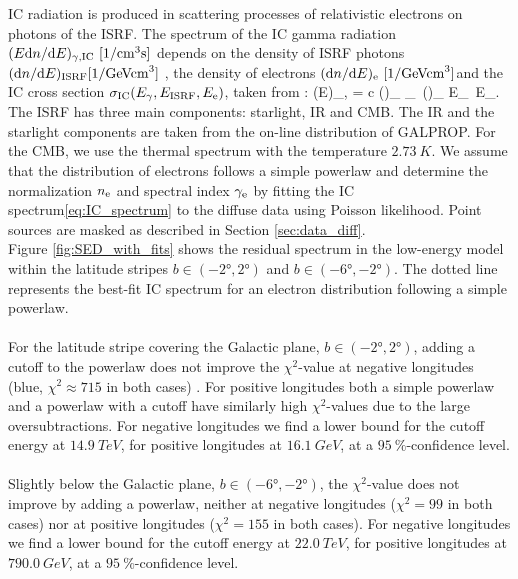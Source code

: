 IC radiation is produced in scattering processes of relativistic electrons on photons of the ISRF. The spectrum of the IC gamma radiation $(E \de n/ \de E)_{\gamma,\IC}\ [\SI{}{1/cm^3s}]$ depends on the density of ISRF photons $(\text{d} n/ \text{d} E)_{\text{ISRF}} [\SI{}{1/GeVcm^3}]$ , the density of electrons $(\de n / \de E)_\el\ [\SI{}{1/GeVcm^3}]$and the IC cross section $\sigma_{\text{IC}}(E_\gamma, E_{\text{ISRF}}, E_{\text{e}})$, taken from \citep{1970RvMP...42..237B}:
\be
\left(E\right)_{\!\!\gamma,\IC}\! = c\int\!\! \int \left(\right)_{\!\!\ISRF} \sigma_\IC\ \left(\right)_{\!\!\el} \de E_\ISRF\, \de E_\el.
\label{eq:IC_spectrum}
\ee
The ISRF has three main components: starlight, IR and CMB. 
The IR and the starlight components are taken from the on-line distribution of GALPROP. 
For the CMB, we use the thermal spectrum with the temperature $\SI{2.73}{K}$. 
We assume that the distribution of electrons follows  a simple powerlaw
and determine the normalization $n_{\text{e}}$ and spectral index $\gamma_{\text{e}}$  by fitting the IC spectrum\eqref{eq:IC_spectrum} to the diffuse \Fermi data using Poisson likelihood.  Point sources are masked as described in Section \ref{sec:data_diff}.\\
Figure \ref{fig:SED_with_fits} shows the residual spectrum in the low-energy model within the latitude stripes $b \in (-\ang{2}, \ang{2})$ and $b \in (-\ang{6}, -\ang{2})$. The dotted line represents the best-fit IC spectrum for an electron distribution following a simple powerlaw. \\
\\
For the latitude stripe covering the Galactic plane, $b \in (-\ang{2}, \ang{2})$, adding a cutoff to the powerlaw does not improve the $\chi^2$-value at negative longitudes (blue, $\chi^2 \approx 715$ in both cases) . For positive longitudes both a simple powerlaw and a powerlaw with a cutoff have similarly high $\chi^2$-values due to the large oversubtractions. For negative longitudes we find a lower bound for the cutoff energy at $\SI{14.9}{TeV}$, for positive longitudes at $\SI{16.1}{GeV}$, at a $\SI{95}{\percent}$-confidence level.\\
\\
Slightly below the Galactic plane, $b \in (-\ang{6}, -\ang{2})$, the $\chi^2$-value does not improve by adding a powerlaw, neither at negative longitudes ($\chi^2 = 99$ in both cases) nor at positive longitudes ($\chi^2 = 155$ in both cases). For negative longitudes we find a lower bound for the cutoff energy at $\SI{22.0}{TeV}$, for positive longitudes at $\SI{790.0}{GeV}$, at a $\SI{95}{\percent}$-confidence level.\\
\\


